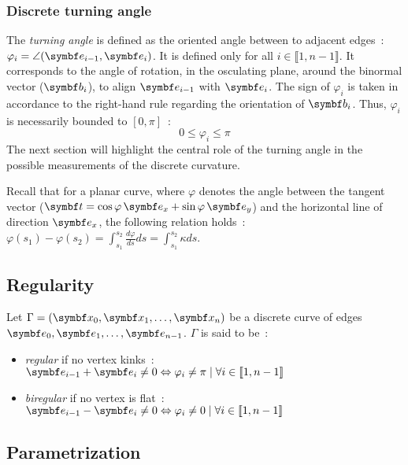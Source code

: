 \subsubsection{Discrete turning angle}
The \emph{turning angle} is defined as the oriented angle between to adjacent edges~: $\varphi_i=\angle(\vect{e}_{i-1},\vect{e}_i)$. It is defined only for all $i \in \llbracket1,n-1\rrbracket$. It corresponds to the angle of rotation, in the osculating plane, around the binormal vector ($\vect{b}_i$), to align $\vect{e}_{i-1}$ with $\vect{e}_{i}$. The sign of $\varphi_i$ is taken in accordance to the right-hand rule regarding the orientation of $\vect{b}_i$. Thus, $\varphi_i$ is necessarily bounded to $[0,\pi]$~:
\begin{equation}
	0 \leqslant \varphi_i \leqslant \pi
\end{equation}
The next section will highlight the central role of the turning angle in the possible measurements of the discrete curvature.

Recall that for a planar curve, where $\varphi$ denotes the angle between the tangent vector ($\vect{t} = \cos\varphi \,\vect{e}_x + \sin\varphi \,\vect{e}_y$) and the horizontal line of direction $\vect{e}_x$, the following relation holds~: $\varphi(s_1) - \varphi(s_2) = \int_{s_1}^{s_2} \frac{d \varphi}{d s} ds = \int_{s_1}^{s_2} \kappa ds$.

\subsection{Regularity}

Let $\Gamma = (\vect{x}_0,  \vect{x}_1, \ldots, \vect{x}_n)$ be a discrete curve of edges $\vect{e}_0,  \vect{e}_1, \ldots, \vect{e}_{n-1}$. $\Gamma$ is said to be~:
\begin{itemize}
	\item  \emph{regular} if no vertex kinks~: $\vect{e}_{i-1} + \vect{e}_{i} \neq 0 \Leftrightarrow \varphi_i \neq \pi \; | \; \forall i \in \llbracket 1,n-1 \rrbracket $
	\item  \emph{biregular} if no vertex is flat~: $\vect{e}_{i-1} - \vect{e}_{i} \neq 0 \Leftrightarrow \varphi_i \neq 0 \; | \; \forall i \in \llbracket 1,n-1 \rrbracket $
\end{itemize}

\subsection{Parametrization}

